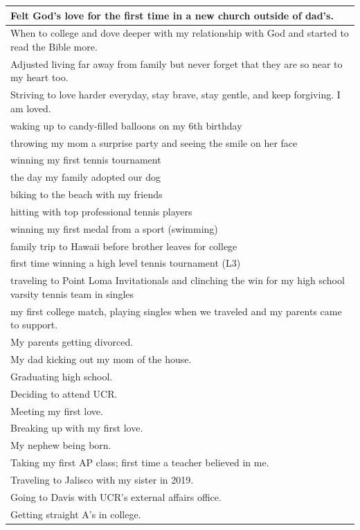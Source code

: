 \documentclass[
  .7em,
  letterpaper,
  DIV=11,
  numbers=noendperiod]{scrartcl}
\begin{document}
\begin{table}
\begin{tabular}{l}
\hline
Felt God's love for the first time in a new church outside of dad's.\\
\hline
When to college and dove deeper with my relationship with God and started to read the Bible more.\\
\hline
Adjusted living far away from family but never forget that they are so near to my heart too.\\
\hline
Striving to love harder everyday, stay brave, stay gentle, and keep forgiving. I am loved.\\
\hline
waking up to candy-filled balloons on my 6th birthday\\
\hline
throwing my mom a surprise party and seeing the smile on her face\\
\hline
winning my first tennis tournament\\
\hline
the day my family adopted our dog\\
\hline
biking to the beach with my friends\\
\hline
hitting with top professional tennis players\\
\hline
winning my first medal from a sport (swimming)\\
\hline
family trip to Hawaii before brother leaves for college\\
\hline
first time winning a high level tennis tournament (L3)\\
\hline
traveling to Point Loma Invitationals and clinching the win for my high school varsity tennis team in singles\\
\hline
my first college match, playing singles when we traveled and my parents came to support.\\
\hline
My parents getting divorced.\\
\hline
My dad kicking out my mom of the house.\\
\hline
Graduating high school.\\
\hline
Deciding to attend UCR.\\
\hline
Meeting my first love.\\
\hline
Breaking up with my first love.\\
\hline
My nephew being born.\\
\hline
Taking my first AP class; first time a teacher believed in me.\\
\hline
Traveling to Jalisco with my sister in 2019.\\
\hline
Going to Davis with UCR's external affairs office.\\
\hline
Getting straight A's in college.\\

\end{tabular}
\end{table}
\end{document}
